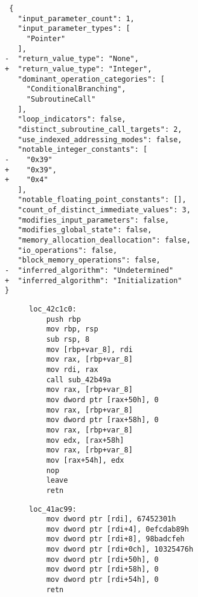 \documentclass[conference,compsoc]{IEEEtran}
\begin{document}
\begin{verbatim}
 {
   "input_parameter_count": 1,
   "input_parameter_types": [
     "Pointer"
   ],
-  "return_value_type": "None",
+  "return_value_type": "Integer",
   "dominant_operation_categories": [
     "ConditionalBranching",
     "SubroutineCall"
   ],
   "loop_indicators": false,
   "distinct_subroutine_call_targets": 2,
   "use_indexed_addressing_modes": false,
   "notable_integer_constants": [
-    "0x39"
+    "0x39",
+    "0x4"
   ],
   "notable_floating_point_constants": [],
   "count_of_distinct_immediate_values": 3,
   "modifies_input_parameters": false,
   "modifies_global_state": false,
   "memory_allocation_deallocation": false,
   "io_operations": false,
   "block_memory_operations": false,
-  "inferred_algorithm": "Undetermined"
+  "inferred_algorithm": "Initialization"
}
\end{verbatim}


\begin{figure}[!t]
\centering
\begin{minipage}[t]{0.48\linewidth}
\begin{verbatim}
loc_42c1c0:
    push rbp
    mov rbp, rsp
    sub rsp, 8
    mov [rbp+var_8], rdi
    mov rax, [rbp+var_8]
    mov rdi, rax
    call sub_42b49a
    mov rax, [rbp+var_8]
    mov dword ptr [rax+50h], 0
    mov rax, [rbp+var_8]
    mov dword ptr [rax+58h], 0
    mov rax, [rbp+var_8]
    mov edx, [rax+58h]
    mov rax, [rbp+var_8]
    mov [rax+54h], edx
    nop 
    leave 
    retn 
\end{verbatim}
\end{minipage}
\hfill
\begin{minipage}[t]{0.48\linewidth}
\begin{verbatim}
loc_41ac99:
    mov dword ptr [rdi], 67452301h
    mov dword ptr [rdi+4], 0efcdab89h
    mov dword ptr [rdi+8], 98badcfeh
    mov dword ptr [rdi+0ch], 10325476h
    mov dword ptr [rdi+50h], 0
    mov dword ptr [rdi+58h], 0
    mov dword ptr [rdi+54h], 0
    retn 
\end{verbatim}
\end{minipage}
\vspace{-1em}
\end{figure}
\end{document}
